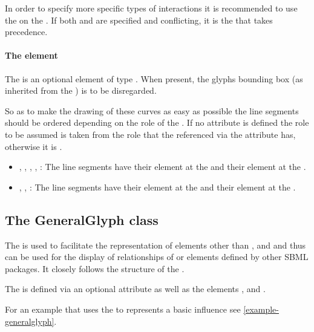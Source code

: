 In order to specify more specific types of interactions it is 
recommended to use the  on the \SpeciesReference. If both
 and  are specified and conflicting, it is the 
 that takes precedence. 


\paragraph{The  element}
The  is an optional element of type \Curve. When present, 
the glyphs bounding box (as inherited from the \GraphicalObject) is to 
be disregarded. 

So as to make the drawing of these curves as easy as possible the line 
segments should be ordered depending on the role of the 
\SpeciesReferenceGlyph. If no  attribute is defined the role 
to be assumed is taken from the role that the \SpeciesReference 
referenced via the attribute  has, otherwise it 
is . 


\begin{itemize}
	\item {, , , 
	, : The line segments have their 
	 element at the \ReactionGlyph and their  
	element at the \SpeciesGlyph.} 
	\item {, 
	, : The line segments have their 
	 element at the \SpeciesGlyph and their  element 
	at the \ReactionGlyph.} 
\end{itemize}

\subsection{The GeneralGlyph class}
\label{generalglyph-class}
The \GeneralGlyph is used to facilitate the representation of elements 
other than \Compartment, \Species and \Reaction and thus can be used for 
the display of relationships of \Rule or elements defined by other SBML 
packages. It closely follows the structure of the \ReactionGlyph. 

The \GeneralGlyph is defined via an optional attribute  
as well as the elements ,  and 
. 

For an example that uses the \GeneralGlyph to represents a basic influence
see \ref{example-generalglyph}.

